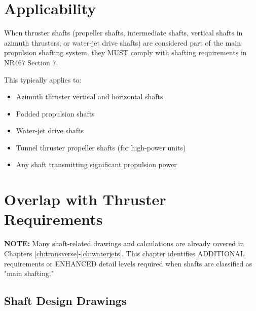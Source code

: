 \documentclass[11pt,a4paper]{report}
\begin{document}
\section{Applicability}

When thruster shafts (propeller shafts, intermediate shafts, vertical shafts in azimuth thrusters, or water-jet drive shafts) are considered part of the main propulsion shafting system, they MUST comply with shafting requirements in NR467 Section 7.

This typically applies to:
\begin{itemize}[leftmargin=*]
\item Azimuth thruster vertical and horizontal shafts
\item Podded propulsion shafts
\item Water-jet drive shafts
\item Tunnel thruster propeller shafts (for high-power units)
\item Any shaft transmitting significant propulsion power
\end{itemize}

\section{Overlap with Thruster Requirements}

\textbf{NOTE:} Many shaft-related drawings and calculations are already covered in Chapters \ref{ch:transverse}-\ref{ch:waterjets}. This chapter identifies ADDITIONAL requirements or ENHANCED detail levels required when shafts are classified as "main shafting."

\subsection{Shaft Design Drawings}
\end{document}
